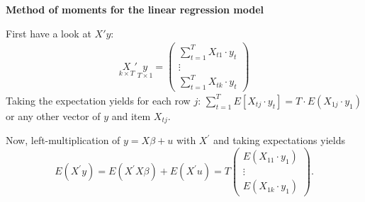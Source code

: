 \begin{Solution}{11.7}
\textbf{Method of moments for the linear regression model}

First have a look at $X'y$:
\begin{align*}
  \underset{k\times T}{X}'\underset{T \times 1}{y} =
  \begin{pmatrix}
    \sum_{t=1}^T X_{t1}\cdot y_t\\
    \vdots\\
    \sum_{t=1}^T X_{tk}\cdot y_t
  \end{pmatrix}
\end{align*}
Taking the expectation yields for each row $j$: $\sum_{t=1}^T E[X_{tj}\cdot
y_t] = T\cdot E(X_{1j} \cdot y_1)$ or any other vector of $y$ and item
$X_{tj}$.

Now, left-multiplication of $y=X\beta +u$ with $X^{\prime }$ and taking expectations yields%
\begin{equation*}
E\left( X^{\prime }y\right) =E\left( X^{\prime }X\beta \right) +E\left(
X^{\prime }u\right) = T
\begin{pmatrix}
    E(X_{11}\cdot y_1)\\
    \vdots\\
    E(X_{1k}\cdot y_1)
\end{pmatrix}.
\end{equation*}%



\end{Solution}
